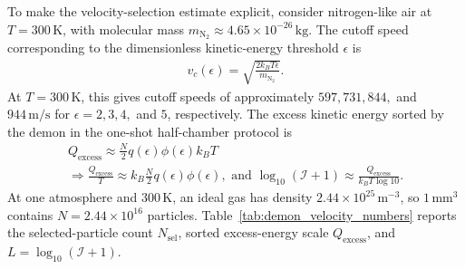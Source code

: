 \documentclass[
  aps,
  prresearch,
  reprint,
  amsmath,
  amssymb,
  superscriptaddress,
  nofootinbib,
  longbibliography
]{revtex4-2}
\def\EQSP{3pt}
\newcommand{\cgather}[2][\EQSP]{\begingroup\setlength\abovedisplayskip{#1}\setlength\belowdisplayskip{#1}\begin{gather} #2 \end{gather}\endgroup\noindent}
\newcommand{\cgathers}[2][\EQSP]{\begingroup\setlength\abovedisplayskip{#1}\setlength\belowdisplayskip{#1}\begin{gather*} #2 \end{gather*}\endgroup\noindent}
\newcommand{\calI}{\mathcal{I}}
\begin{document}
To make the velocity-selection estimate explicit, consider nitrogen-like air at \(T=300\,\mathrm{K}\), with molecular mass \(m_{\mathrm{N_2}}\approx 4.65\times 10^{-26}\,\mathrm{kg}\). The cutoff speed corresponding to the dimensionless kinetic-energy threshold \(\epsilon\) is
\cgather{
    v_c(\epsilon)
    =
    \sqrt{\frac{2k_B T\epsilon}{m_{\mathrm{N_2}}}}.
}
At \(T=300\,\mathrm{K}\), this gives cutoff speeds of approximately \(597,731,844,\) and \(944\,\mathrm{m/s}\) for \(\epsilon=2,3,4,\) and \(5\), respectively. The excess kinetic energy sorted by the demon in the one-shot half-chamber protocol is
\cgathers{
    Q_{\mathrm{excess}}
    \approx
    \frac{N}{2}q(\epsilon)\phi(\epsilon)k_B T\\
    \Rightarrow 
    \frac{Q_{\mathrm{excess}}}{T}
    \approx
    k_B\frac{N}{2}q(\epsilon)\phi(\epsilon),
    \text{ and }
    \log_{10}(\calI+1)
    \approx
    \frac{Q_{\mathrm{excess}}}{k_B T\log 10}.
}
At one atmosphere and \(300\,\mathrm{K}\), an ideal gas has density \(2.44\times10^{25}\,\mathrm{m}^{-3}\), so \(1\,\mathrm{mm}^3\) contains \(N=2.44\times10^{16}\) particles. Table~\ref{tab:demon_velocity_numbers} reports the selected-particle count \(N_{\mathrm{sel}}\), sorted excess-energy scale \(Q_{\mathrm{excess}}\), and \(L=\log_{10}(\calI+1)\).
\end{document}
